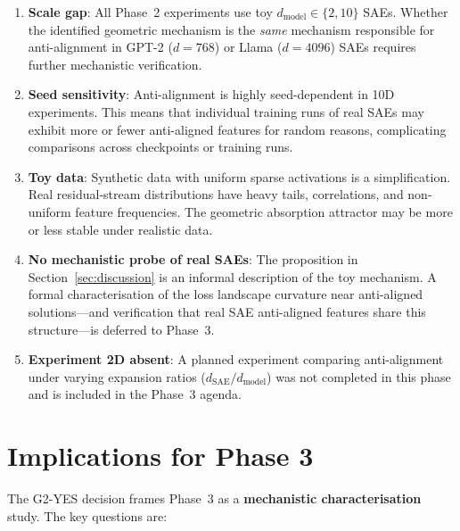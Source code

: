 \documentclass[11pt,a4paper]{article}
\begin{document}
\begin{enumerate}[noitemsep]
  \item \textbf{Scale gap}: All Phase~2 experiments use toy $d_{\mathrm{model}} \in \{2, 10\}$
        SAEs.  Whether the identified geometric mechanism is the \emph{same} mechanism
        responsible for anti-alignment in GPT-2 ($d=768$) or Llama ($d=4096$) SAEs requires
        further mechanistic verification.

  \item \textbf{Seed sensitivity}: Anti-alignment is highly seed-dependent in 10D
        experiments.  This means that individual training runs of real SAEs may exhibit
        more or fewer anti-aligned features for random reasons, complicating comparisons
        across checkpoints or training runs.

  \item \textbf{Toy data}: Synthetic data with uniform sparse activations is a
        simplification.  Real residual-stream distributions have heavy tails, correlations,
        and non-uniform feature frequencies.  The geometric absorption attractor may be
        more or less stable under realistic data.

  \item \textbf{No mechanistic probe of real SAEs}: The proposition in
        Section~\ref{sec:discussion} is an informal description of the toy mechanism.
        A formal characterisation of the loss landscape curvature near anti-aligned
        solutions---and verification that real SAE anti-aligned features share this
        structure---is deferred to Phase~3.

  \item \textbf{Experiment 2D absent}: A planned experiment comparing anti-alignment
        under varying expansion ratios ($d_{\mathrm{SAE}} / d_{\mathrm{model}}$)
        was not completed in this phase and is included in the Phase~3 agenda.
\end{enumerate}

\section{Implications for Phase 3}
\label{sec:phase3}

The G2-YES decision frames Phase~3 as a \textbf{mechanistic characterisation} study.
The key questions are:
\end{document}

